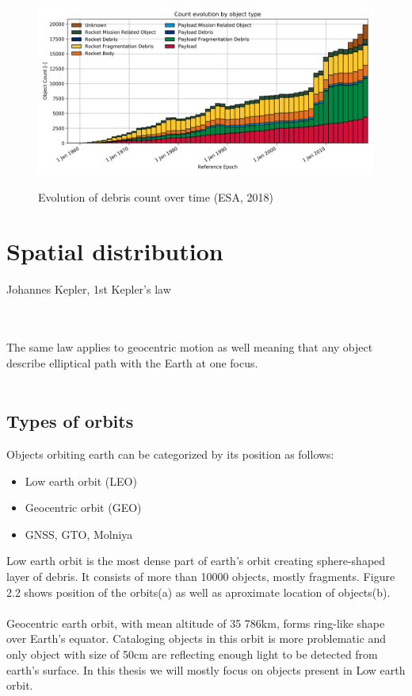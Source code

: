 \documentclass[12pt, a4paper, oneside]{book}
\begin{document}
\begin{figure}[!hbt]
    \begin{center}
        \includegraphics[scale=0.60]{images/debris_count.png}
        \label{img:debris_count}
        \caption{Evolution of debris count over time (ESA, 2018)}
    \end{center}
\end{figure}


\section{Spatial distribution}

\begin{flushright}
    Johannes Kepler, 1st Kepler's law
\end{flushright}
\\
\\
The same law applies to geocentric motion as well meaning that any object describe elliptical path with the Earth at one focus.
\\
\\

\subsection{Types of orbits}

Objects orbiting earth can be categorized by its position as follows:
\begin{itemize}
    \item{Low earth orbit (LEO)}
    \item{Geocentric orbit (GEO)}
    \item{GNSS, GTO, Molniya}
\end{itemize}

Low earth orbit is the most dense part of earth's orbit creating sphere-shaped layer of debris.
It consists of more than 10000 objects, mostly fragments.
Figure 2.2 shows position of the orbits(a) as well as aproximate location of objects(b).
\\
\\
Geocentric earth orbit, with mean altitude of 35 786km, forms ring-like shape over Earth's equator.
Cataloging objects in this orbit is more problematic and only object with size of 50cm are reflecting enough light to be detected from earth's surface.
In this thesis we will mostly focus on objects present in Low earth orbit.
\\
\end{document}
